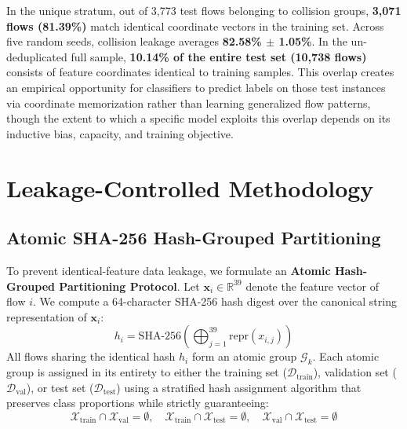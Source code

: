 \documentclass[conference,10pt,twocolumn]{IEEEtran}
\begin{document}
In the unique stratum, out of 3,773 test flows belonging to collision groups, \textbf{3,071 flows (81.39\%)} match identical coordinate vectors in the training set. Across five random seeds, collision leakage averages \textbf{82.58\% $\pm$ 1.05\%}. In the un-deduplicated full sample, \textbf{10.14\% of the entire test set (10,738 flows)} consists of feature coordinates identical to training samples. This overlap creates an empirical opportunity for classifiers to predict labels on those test instances via coordinate memorization rather than learning generalized flow patterns, though the extent to which a specific model exploits this overlap depends on its inductive bias, capacity, and training objective.

\section{Leakage-Controlled Methodology}
\label{sec:methodology}

\subsection{Atomic SHA-256 Hash-Grouped Partitioning}
To prevent identical-feature data leakage, we formulate an \textbf{Atomic Hash-Grouped Partitioning Protocol}. 
Let $\mathbf{x}_i \in \mathbb{R}^{39}$ denote the feature vector of flow $i$. We compute a 64-character SHA-256 hash digest over the canonical string representation of $\mathbf{x}_i$:
\begin{equation}
h_i = \text{SHA-256}\left(\bigoplus_{j=1}^{39} \text{repr}(x_{i,j})\right)
\end{equation}
All flows sharing the identical hash $h_i$ form an atomic group $\mathcal{G}_k$. Each atomic group is assigned in its entirety to either the training set ($\mathcal{D}_{\text{train}}$), validation set ($\mathcal{D}_{\text{val}}$), or test set ($\mathcal{D}_{\text{test}}$) using a stratified hash assignment algorithm that preserves class proportions while strictly guaranteeing:
\begin{equation}
\mathcal{X}_{\text{train}} \cap \mathcal{X}_{\text{val}} = \emptyset, \quad \mathcal{X}_{\text{train}} \cap \mathcal{X}_{\text{test}} = \emptyset, \quad \mathcal{X}_{\text{val}} \cap \mathcal{X}_{\text{test}} = \emptyset
\end{equation}
\end{document}
